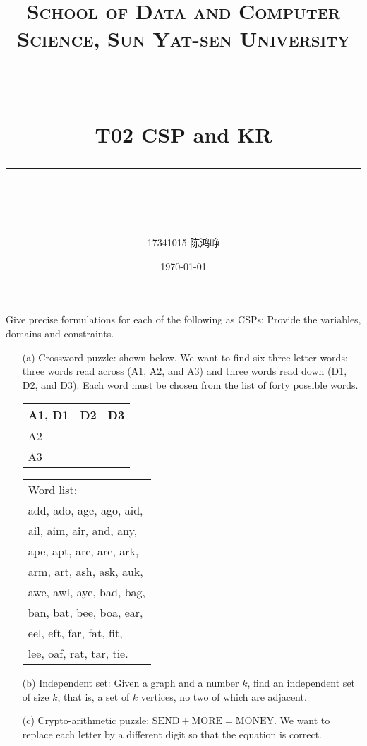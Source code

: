 \documentclass[a4paper, 11pt]{article}
\title{
\normalfont \normalsize
\textsc{School of Data and Computer Science, Sun Yat-sen University} \\ [25pt] %
\rule{\textwidth}{0.5pt} \\[0.4cm] %
\huge  T02 CSP and KR\\ %
\rule{\textwidth}{2pt} \\[0.5cm] %
\author{17341015 陈鸿峥}
\date{\normalsize\today}
}
\begin{document}
\maketitle
\newpage


\begin{question}\normalfont
    Give precise formulations for each of the following as CSPs: Provide the variables, domains and constraints.
    \begin{itemize}
    \item [(a)] Crossword puzzle: shown below. We want to find six three-letter words: three words read across (A1, A2, and A3) and three words read down (D1, D2, and D3). Each word must be chosen from the list of forty possible words.
    \begin{center}
        {\scriptsize
        \begin{tabular}{|p{1cm}|p{1cm}|p{1cm}|}\hline
            A1, D1 & D2 & D3\\[1cm]\hline
            A2 & & \\[1cm]\hline
            A3 & & \\[1cm]\hline
        \end{tabular}}
        {\small
        \begin{tabular}{l}
            Word list:\\
            add, ado, age, ago, aid,\\
            ail, aim, air, and, any,\\
            ape, apt, arc, are, ark,\\
            arm, art, ash, ask, auk,\\
            awe, awl, aye, bad, bag,\\
            ban, bat, bee, boa, ear,\\
            eel, eft, far, fat, fit,\\
            lee, oaf, rat, tar, tie.
        \end{tabular}}
    \end{center}
    \item [(b)] Independent set: Given a graph and a number $k$, find an independent set of size $k$, that is, a set of $k$ vertices, no two of which are adjacent.
    \item [(c)] Crypto-arithmetic puzzle: $\text{SEND} + \text{MORE} = \text{MONEY}$. We want to replace each letter by a different digit so that the equation is correct.
    \end{itemize}
\end{question}
\end{document}

